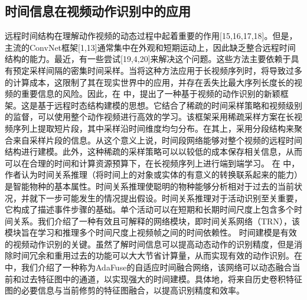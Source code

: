 \subsection{时间信息在视频动作识别中的应用}
远程时间结构在理解动作视频的动态过程中起着重要的作用[15,16,17,18]。但是，主流的ConvNet框架[1,13]通常集中在外观和短期运动上，因此缺乏整合远程时间结构的能力。最近，有一些尝试[19,4,20]来解决这个问题。这些方法主要依赖于具有预定采样间隔的密集时间采样。当将这种方法应用于长视频序列时，将导致过多的计算成本，这限制了其在现实世界中的应用，并存在丢失比最大序列长度长的视频的重要信息的风险。因此，在 \cite{TSN} 中，提出了一种基于视频的动作识别的新颖框架。这是基于远程时态结构建模的思想。它结合了稀疏的时间采样策略和视频级别的监督，可以使用整个动作视频进行高效的学习。该框架采用稀疏采样方案在长视频序列上提取短片段，其中采样沿时间维度均匀分布。在其上，采用分段结构来聚合来自采样片段的信息。从这个意义上说，时间段网络能够对整个视频的远程时间结构进行建模。此外，这种稀疏的采样策略可以以较低的成本保存相关信息，从而可以在合理的时间和计算资源预算下，在长视频序列上进行端到端学习。%
在 \cite{TRN} 中，作者认为时间关系推理（将时间上的对象或实体的有意义的转换联系起来的能力）是智能物种的基本属性。时间关系推理使聪明的物种能够分析相对于过去的当前状况，并就下一步可能发生的情况提出假设。时间关系推理对于活动识别至关重要，它构成了描述事件步骤的基础。单个活动可以在短期和长期时间尺度上包含多个时间关系。我们介绍了一种有效且可解释的网络模块，即时间关系网络（TRN），该模块旨在学习和推理多个时间尺度上视频帧之间的时间依赖性。%
时间建模是有效的视频动作识别的关键。虽然了解时间信息可以提高动态动作的识别精度，但是消除时间冗余和重用过去的功能可以大大节省计算量，从而实现有效的动作识别。在 \cite{AdaFuse} 中，我们介绍了一种称为AdaFuse的自适应时间融合网络，该网络可以动态融合当前和过去特征图中的通道，以实现强大的时间建模。具体地，将来自历史卷积特征图的必要信息与当前修剪的特征图融合，以提高识别精度和效率。%
